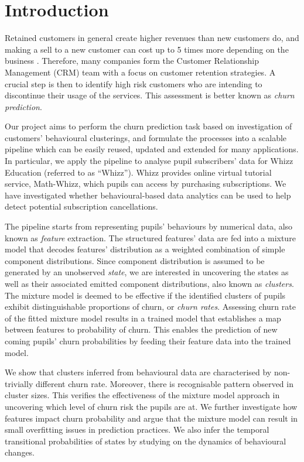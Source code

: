 \section{Introduction}
\label{sec:intro}

Retained customers in general create higher revenues than new customers do, and making a sell to a new customer can cost up to 5 times more depending on the business \cite{Slater2000}. Therefore, many companies form the Customer Relationship Management (CRM) team with a focus on customer retention strategies. A crucial step is then to identify high risk customers who are intending to discontinue their usage of the services. This assessment is better known as \textit{churn prediction}.

Our project aims to perform the churn prediction task based on investigation of customers' behavioural clusterings, and formulate the processes into a scalable pipeline which can be easily reused, updated and extended for many applications. In particular, we apply the pipeline to analyse pupil subscribers' data for Whizz Education (referred to as ``Whizz''). Whizz provides online virtual tutorial service, Math-Whizz, which pupils can access by purchasing subscriptions. We have investigated whether behavioural-based data analytics can be used to help detect potential subscription cancellations.

The pipeline starts from representing pupils' behaviours by numerical data, also known as \textit{feature} extraction. The structured features' data are fed into a mixture model that decodes features' distribution as a weighted combination of simple component distributions. Since component distribution is assumed to be generated by an unobserved \textit{state}, we are interested in uncovering the states as well as their associated emitted component distributions, also known as \textit{clusters}. The mixture model is deemed to be effective if the identified clusters of pupils exhibit distinguishable proportions of churn, or \textit{churn rates}. Assessing churn rate of the fitted mixture model results in a trained model that establishes a map between features to probability of churn. This enables the prediction of new coming pupils' churn probabilities by feeding their feature data into the trained model.

We show that clusters inferred from behavioural data are characterised by non-trivially different churn rate. Moreover, there is recognisable pattern observed in cluster sizes. This verifies the effectiveness of the mixture model approach in uncovering which level of churn risk the pupils are at. We further investigate how features impact churn probability and argue that the mixture model can result in small overfitting issues in prediction practices. We also infer the temporal transitional probabilities of states by studying on the dynamics of behavioural changes.

